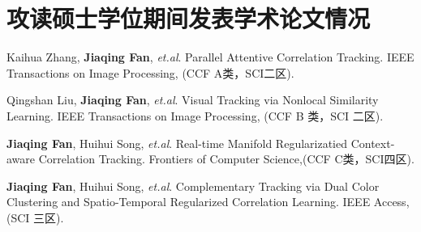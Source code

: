 ﻿\chapter*{\hfill 攻读硕士学位期间发表学术论文情况 \hfill}

\begin{enumerate}[label={[\arabic*]}]
\item {Kaihua Zhang, \song\bf Jiaqing Fan}, \textit{et.al}. Parallel Attentive Correlation Tracking. IEEE Transactions on Image Processing, (CCF A类，SCI二区).

\item {Qingshan Liu, \song\bf Jiaqing Fan}, \textit{et.al}. Visual Tracking via Nonlocal Similarity Learning. IEEE Transactions on Image Processing, (CCF B 类，SCI 二区).

\item {\song\bf Jiaqing Fan}, Huihui Song, \textit{et.al}. Real-time Manifold Regularizatied Context-aware Correlation Tracking. Frontiers of Computer Science,(CCF C类，SCI四区).
    
\item {\song\bf Jiaqing Fan}, Huihui Song, \textit{et.al}. Complementary Tracking via Dual Color Clustering and Spatio-Temporal Regularized Correlation Learning. IEEE Access, (SCI 三区).
\end{enumerate}




